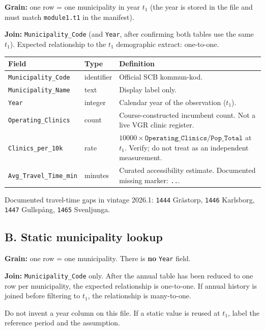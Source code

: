 \documentclass[11pt,a4paper]{article}
\begin{document}
\textbf{Grain:} one row = one municipality in year $t_1$
(the year is stored in the file and must match
\texttt{module1.t1} in the manifest).

\textbf{Join:} \texttt{Municipality\_Code} (and \texttt{Year}, after
confirming both tables use the same $t_1$). Expected relationship
to the $t_1$ demographic extract: one-to-one.

\begin{center}
\small
\begin{tabularx}{\textwidth}{@{}p{}p{}X@{}}
\toprule
Field & Type & Definition \\
\midrule
\texttt{Municipality\_Code} & identifier & Official SCB kommun-kod. \\
\texttt{Municipality\_Name} & text & Display label only. \\
\texttt{Year} & integer & Calendar year of the observation ($t_1$). \\
\texttt{Operating\_Clinics} & count & Course-constructed incumbent
count. Not a live VGR clinic register. \\
\texttt{Clinics\_per\_10k} & rate &
$10000 \times \texttt{Operating\_Clinics} / \texttt{Pop\_Total}$
at $t_1$. Verify; do not treat as an independent measurement. \\
\texttt{Avg\_Travel\_Time\_min} & minutes & Curated accessibility
estimate. Documented missing marker: \texttt{..}. \\
\bottomrule
\end{tabularx}
\end{center}

Documented travel-time gaps in vintage 2026.1:
\texttt{1444} Gr\"astorp, \texttt{1446} Karlsborg, \texttt{1447}
Gullsp\aa ng, \texttt{1465} Svenljunga.

\subsection*{B. Static municipality lookup}

\textbf{Grain:} one row = one municipality. There is \textbf{no}
\texttt{Year} field.

\textbf{Join:} \texttt{Municipality\_Code} only. After the annual
table has been reduced to one row per municipality, the expected
relationship is one-to-one. If annual history is joined before
filtering to $t_1$, the relationship is many-to-one.

Do not invent a year column on this file. If a static value is reused
at $t_1$, label the reference period and the assumption.
\end{document}
